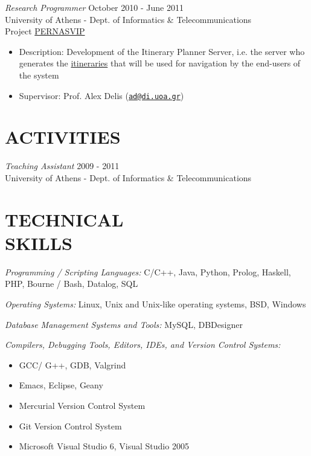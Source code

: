 \documentclass[margin]{res}
\begin{document}
\begin{resume}
        {\sl Research Programmer} \hfill October 2010 - June 2011 \\
        University of Athens - Dept. of Informatics \& Telecommunications \\
        Project \href{http://pernasvip.di.uoa.gr/index.php}{PERNASVIP}
        \begin{itemize}
        \item Description: Development of the Itinerary Planner Server, i.e. the server who
          generates the 
          \href{http://pernasvip.di.uoa.gr/index.php/gen-spef/itinerary-example}{itineraries} 
          that will be used for navigation by the end-users of the system
        \item Supervisor: Prof. Alex Delis
          (\href{mailto:ad@di.uoa.gr}{\nolinkurl{ad@di.uoa.gr}})
        \end{itemize}

\section{ACTIVITIES}
        {\sl Teaching Assistant} \hfill 2009 - 2011 \\
        University of Athens - Dept. of Informatics \& Telecommunications

\section{TECHNICAL \\ SKILLS}
        {\sl Programming / Scripting Languages:} 
        C/C++, Java, Python, Prolog, Haskell, PHP, Bourne / Bash, Datalog, SQL

        {\sl Operating Systems:}
        Linux, Unix and Unix-like operating systems, BSD, Windows

        {\sl Database Management Systems and Tools:}
        MySQL, DBDesigner

        {\sl Compilers, Debugging Tools, Editors, IDEs, and Version Control Systems:}
        \begin{itemize}
        \item GCC/ G++, GDB, Valgrind
        \item Emacs, Eclipse, Geany
        \item Mercurial Version Control System
        \item Git Version Control System
        \item Microsoft Visual Studio 6, Visual Studio 2005
        \end{itemize}


\end{resume}
\end{document}
